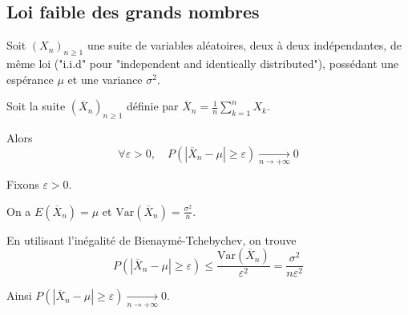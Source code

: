 \documentclass[a4paper, 12pt]{article}
\begin{document}
\subsection{Loi faible des grands nombres}

\begin{theoreme}{}{}
    Soit $(X_n)_{n \geq 1}$ une suite de variables aléatoires, deux à deux indépendantes, de même loi ("i.i.d" pour "independent and identically distributed"), possédant une espérance $\mu$ et une variance $\sigma^2$.

    Soit la suite $(\overline{X}_n)_{n \geq 1}$ définie par $\overline{X}_n = \frac{1}{n} \sum_{k=1}^n X_k$.

    Alors
    $$
    \forall \varepsilon > 0, \quad P(|\overline{X}_n - \mu| \geq \varepsilon) \xrightarrow[n \to +\infty]{} 0
    $$
\end{theoreme}

\begin{demonstration}
    Fixons $\varepsilon > 0$.

    On a $E(\overline{X}_n) = \mu$ et $\mathrm{Var}(\overline{X}_n) = \frac{\sigma^2}{n}$.

    En utilisant l'inégalité de Bienaymé-Tchebychev, on trouve
    $$
    P(|\overline{X}_n - \mu| \geq \varepsilon) \leq \frac{\mathrm{Var}(\overline{X}_n)}{\varepsilon^2} = \frac{\sigma^2}{n \varepsilon^2}
    $$

    Ainsi $P(|\overline{X}_n - \mu| \geq \varepsilon) \xrightarrow[n \to +\infty]{} 0$.
\end{demonstration}
\end{document}
